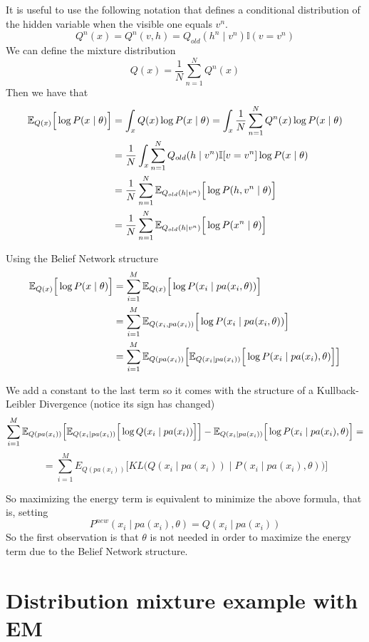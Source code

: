 It is useful to use the following notation that defines a conditional distribution of the hidden variable when the visible one equals \(v^{n}\).
\[
  Q^{n}(x) = Q^{n}(v,h) = Q_{old}(h^{n} \mid v^{n}) \mathbb{I}(v = v^{n})
\]
We can define the mixture distribution
\[
  Q(x) = \frac{1}{N}\sum_{n = 1}^{N}Q^{n}(x)
\]
Then we have that
\[
  \begin{aligned}
    \mathbb{E}_{Q(x)}\Big[\log{P(x \mid \theta)}\Big] &= \int_{x}Q(x)\log{P(x \mid \theta)} =  \int_{x} \frac{1}{N}\sum_{n=1}^{N}Q^{n}(x)\log{P(x \mid \theta)} \\
    &= \frac{1}{N} \int_{x}\sum_{n=1}^{N}Q_{old}(h \mid v^{n})\mathbb{I}[v = v^{n}]\log{P(x \mid \theta)}\\
    &= \frac{1}{N}\sum_{n = 1}^{N}\mathbb{E}_{Q_{old}(h \mid v^{n})}\Big[\log{P(h, v^{n} \mid \theta)}\Big]\\
    &= \frac{1}{N}\sum_{n = 1}^{N}\mathbb{E}_{Q_{old}(h \mid v^{n})}\Big[\log{P(x^{n} \mid \theta)}\Big]
  \end{aligned}
\]

Using the Belief Network structure
\[
  \begin{aligned}
    \mathbb{E}_{Q(x)}\Big[\log{P(x \mid \theta)}\Big] &= \sum_{i = 1}^{M}\mathbb{E}_{Q(x)}\Big[\log{P(x_{i} \mid pa(x_{i}, \theta))}\Big]\\
    &= \sum_{i = 1}^{M}\mathbb{E}_{Q(x_{i}, pa(x_{i}))}\Big[\log{P(x_{i} \mid pa(x_{i}, \theta))}\Big]\\
    &= \sum_{i = 1}^{M}\mathbb{E}_{Q(pa(x_{i}))}\Big[ \mathbb{E}_{Q(x_{i}\mid pa(x_{i}))}\Big[ \log{P(x_{i} \mid pa(x_{i}), \theta)}\Big]\Big]
\end{aligned}
\]

We add a constant to the last term so it comes with the structure of a Kullback-Leibler Divergence (notice its sign has changed)
\[
  \sum_{i = 1}^{M}\mathbb{E}_{Q(pa(x_{i}))}\Big[\mathbb{E}_{Q(x_{i}\mid pa(x_{i}))}\Big[\log{Q(x_{i} \mid pa(x_{i}))}\Big]\Big] - \mathbb{E}_{Q(x_{i}\mid pa(x_{i}))}\Big[\log{P(x_{i} \mid pa(x_{i}), \theta)}\Big]=
\]
\[
  = \sum_{i = 1}^{M} E_{Q(pa(x_{i}))} \Big[KL \Big( Q(x_{i}\mid pa(x_{i})) \mid P(x_{i} \mid pa(x_{i}), \theta) \Big) \Big]
\]

So maximizing the energy term is equivalent to minimize the above formula, that is, setting
\[
  P^{new}(x_{i} \mid pa(x_{i}), \theta) = Q(x_{i} \mid pa(x_{i}))
\]
So the first observation is that \(\theta\) is not needed in order to maximize the energy term due to the Belief Network structure.

\section{Distribution mixture example with EM}

